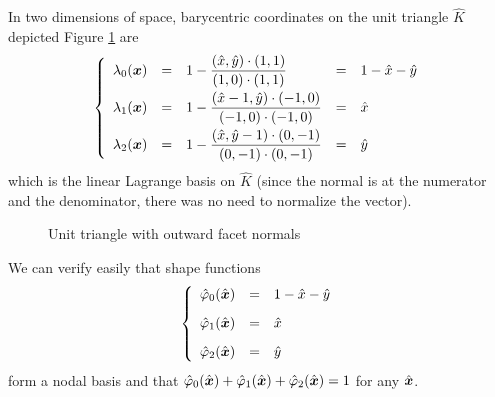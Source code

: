 \begin{xmpl}
In two dimensions of space, barycentric coordinates on the unit triangle $\hat K$ depicted Figure \ref{fig:barycentric_coords_2d} are
\begin{equation*}
\left\lbrace
\begin{array}{lclcl}
\lambda_0({{\boldsymbol x}}) &=& 1 - \displaystyle\frac{(\hat x,\hat y)\cdot(1,1)}{(1,0)\cdot(1,1)} &=& 1 - \hat x -\hat y\\[2ex]
\lambda_1({{\boldsymbol x}}) &=& 1 - \displaystyle\frac{(\hat x-1,\hat y)\cdot(-1,0)}{(-1,0)\cdot(-1,0)} &=& \hat x\\[2ex]
\lambda_2({{\boldsymbol x}}) &=& 1 - \displaystyle\frac{(\hat x,\hat y-1)\cdot(0,-1)}{(0,-1)\cdot(0,-1)} &=& \hat y\\
\end{array}
\right.
\end{equation*}
which is the linear Lagrange basis on $\hat K$ (since the normal is at the numerator and the denominator, there was no need to normalize the vector).

\begin{figure}[h!]\label{fig:barycentric_coords_2d}
\centering
{}
\caption{Unit triangle with outward facet normals}
\end{figure}

We can verify easily that shape functions
\begin{equation*}
\left\lbrace
\begin{array}{lclcl}
\hat\varphi_0(\hat{{{\boldsymbol x}}}) &=& 1 - \hat x -\hat y\\[2ex]
\hat\varphi_1(\hat{{{\boldsymbol x}}}) &=& \hat x\\[2ex]
\hat\varphi_2(\hat{{{\boldsymbol x}}}) &=& \hat y\\
\end{array}
\right.
\end{equation*}
form a nodal basis and that $\hat\varphi_0(\hat{{{\boldsymbol x}}}) + \hat\varphi_1(\hat{{{\boldsymbol x}}}) + \hat\varphi_2(\hat{{{\boldsymbol x}}}) = 1$ for any $\hat{{{\boldsymbol x}}}$.

\end{xmpl}

